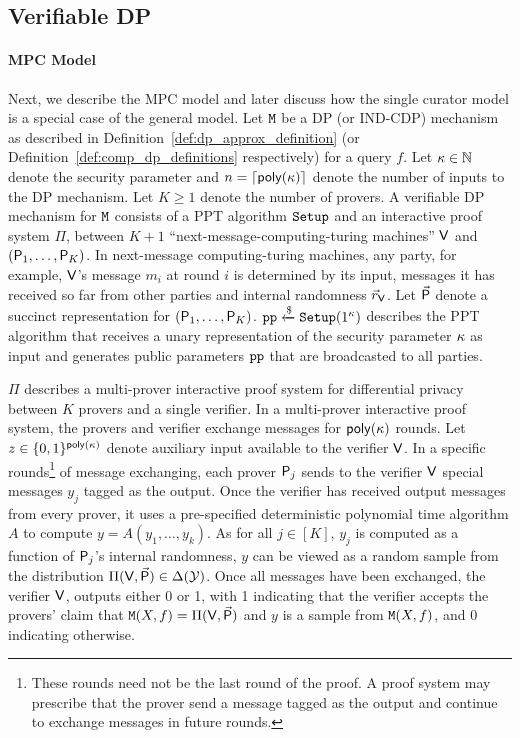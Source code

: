%
\subsection{Verifiable DP}

\paragraph{MPC Model}
Next, we describe the MPC model and later discuss how the single curator model is a special case of the general model.
Let $\mathtt{M}$ be a DP (or IND-CDP) mechanism as described in Definition~\ref{def:dp_approx_definition} (or Definition~\ref{def:comp_dp_definitions} respectively) for a query $f$.  
Let $\kappa \in \mathbb{N}$ denote the security parameter and $n=\lceil\mathsf{poly}(\kappa)\rceil$ denote the number of inputs to the DP mechanism. Let $K \geq 1$ denote the number of provers. A verifiable DP mechanism for $\mathtt{M}$  consists of a PPT algorithm $\mathtt{Setup}$  and an interactive proof system $\Pi$, between $K+1$ ``next-message-computing-turing machines'' $\mathsf{V}$ and $(\mathsf{P}_1, \dots, \mathsf{P}_K)$. 
In next-message computing-turing machines, any party, for example, $\mathsf{V}$'s message $m_i$ at round $i$ is determined by its input, messages it has received so far from other parties and internal randomness $\vec{r}_{\mathsf{V}}$.  
Let $\vec{\mathsf{P}}$ denote a succinct representation for $(\mathsf{P}_1, \dots, \mathsf{P}_K)$. 
$\texttt{pp} \xleftarrow{\$} \mathtt{Setup}(1^\kappa)$ describes the PPT algorithm that receives a unary representation of the security parameter $\kappa$ as input and generates public parameters $\texttt{pp}$ that are broadcasted to all parties.

$\Pi$ describes a multi-prover interactive proof system for differential privacy between $K$ provers and a single verifier. In a multi-prover interactive proof system, the provers and verifier exchange messages for $\mathsf{poly}(\kappa)$ rounds. Let $z \in \{ 0, 1\}^{\mathsf{poly}(\kappa)}$ denote auxiliary input available to the verifier $\mathsf{V}$. In a specific rounds\footnote{These rounds need not be the last round of the proof. A proof system may prescribe that the prover send a message tagged as the output and continue to exchange messages in future rounds.} of message exchanging, each prover $\mathsf{P}_j$ sends to the verifier $\mathsf{V}$ special messages $y_j$ tagged as the output. Once the verifier has received output messages from every prover, it uses a pre-specified deterministic polynomial time algorithm $A$ to compute $y = A(y_1, \dots, y_k)$. As for all $j \in [K]$, $y_j$ is computed as a function of $\mathsf{P}_j$'s internal randomness, $y$ can be viewed as a random sample from the distribution $\Pi(\mathsf{V}, \vec{\mathsf{P}}) \in \Delta(\mathcal{Y})$. Once all messages have been exchanged, the verifier $\mathsf{V}$,  outputs either 0 or 1, with 1 indicating that the verifier accepts the provers' claim that $\mathtt{M}(X, f)=\Pi(\mathsf{V}, \vec{\mathsf{P}})$ and $y$ is a sample from $\mathtt{M}(X, f)$, and 0 indicating otherwise.

